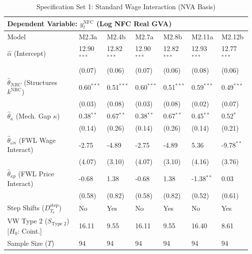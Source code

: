 \begin{table}[H]
\centering
\setlength{\tabcolsep}{2.5pt}
\caption{Specification Set 1: Standard Wage Interaction (NVA Basis)}
\label{tab:specB_set1_nva_core}
\scriptsize
\begin{tabular}{p{3.8cm}p{1.1cm}p{1.1cm}p{1.1cm}p{1.1cm}p{1.1cm}p{1.1cm}}
\toprule
\multicolumn{7}{l}{\textbf{Dependent Variable: $y_t^{\text{NFC}}$ (Log NFC Real GVA)}} \\
\midrule
Model & M2.3a & M2.4b & M2.7a & M2.8b & M2.11a & M2.12b \\
\midrule
$\hat{\alpha}$ (Intercept) & 12.90$^{***}$ & 12.82$^{***}$ & 12.90$^{***}$ & 12.82$^{***}$ & 12.93$^{***}$ & 12.77$^{***}$ \\
 & (0.07) & (0.06) & (0.07) & (0.06) & (0.08) & (0.06) \\
$\hat{\theta}_{NRC}$ (Structures $k^{\text{NRC}}$) & 0.60$^{***}$ & 0.51$^{***}$ & 0.60$^{***}$ & 0.51$^{***}$ & 0.59$^{***}$ & 0.49$^{***}$ \\
 & (0.03) & (0.08) & (0.03) & (0.08) & (0.02) & (0.07) \\
$\hat{\theta}_{\kappa}$ (Mech. Gap $\kappa$) & 0.38$^{**}$ & 0.67$^{**}$ & 0.38$^{**}$ & 0.67$^{**}$ & 0.45$^{**}$ & 0.52$^{*}$ \\
 & (0.14) & (0.26) & (0.14) & (0.26) & (0.14) & (0.21) \\
$\hat{\theta}_{\omega\kappa}$ (FWL Wage Interact) & -2.75 & -4.89 & -2.75 & -4.89 & 5.36 & -9.78$^{**}$ \\
 & (4.07) & (3.10) & (4.07) & (3.10) & (4.16) & (3.76) \\
$\hat{\theta}_{\kappa p}$ (FWL Price Interact) & -0.68 & 1.38 & -0.68 & 1.38 & -1.38$^{**}$ & 0.03 \\
 & (0.58) & (0.82) & (0.58) & (0.82) & (0.52) & (0.61) \\
Step Shifts ($D_{T_b}^{\text{step}}$) & No & Yes & No & Yes & No & Yes \\
\midrule
VW Type 2 ($S_{\text{Type 2}}$) [$H_0$: Coint.] & 16.11 & 9.55 & 16.11 & 9.55 & 16.40 & 8.61 \\
\midrule
Sample Size ($T$) & 94 & 94 & 94 & 94 & 94 & 94 \\
\bottomrule

\end{tabular}
\end{table}
